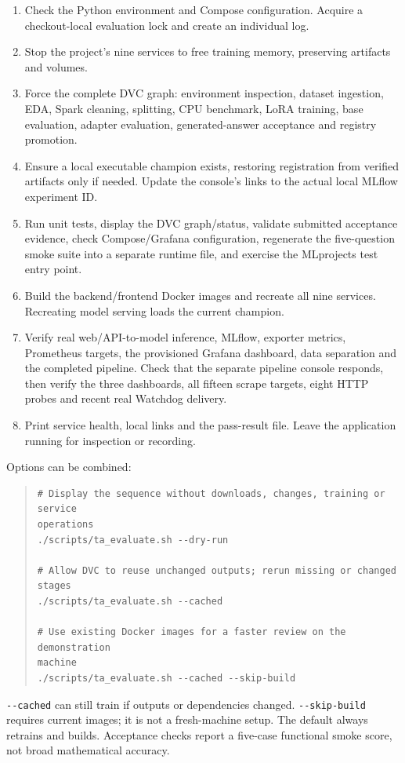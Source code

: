 \documentclass[11pt,a4paper]{article}
\begin{document}
\begin{enumerate}
\item Check the Python environment and Compose configuration. Acquire a checkout-local evaluation lock and create an individual log.
\item Stop the project's nine services to free training memory, preserving artifacts and volumes.
\item Force the complete DVC graph: environment inspection, dataset ingestion, EDA, Spark cleaning, splitting, CPU benchmark, LoRA training, base evaluation, adapter evaluation, generated-answer acceptance and registry promotion.
\item Ensure a local executable champion exists, restoring registration from verified artifacts only if needed. Update the console's links to the actual local MLflow experiment ID.
\item Run unit tests, display the DVC graph/status, validate submitted acceptance evidence, check Compose/Grafana configuration, regenerate the five-question smoke suite into a separate runtime file, and exercise the MLprojects test entry point.
\item Build the backend/frontend Docker images and recreate all nine services. Recreating model serving loads the current champion.
\item Verify real web/API-to-model inference, MLflow, exporter metrics, Prometheus targets, the provisioned Grafana dashboard, data separation and the completed pipeline. Check that the separate pipeline console responds, then verify the three dashboards, all fifteen scrape targets, eight HTTP probes and recent real Watchdog delivery.
\item Print service health, local links and the pass-result file. Leave the application running for inspection or recording.
\end{enumerate}
Options can be combined:

\begin{quote}\small
\begin{verbatim}
# Display the sequence without downloads, changes, training or service
operations
./scripts/ta_evaluate.sh --dry-run

# Allow DVC to reuse unchanged outputs; rerun missing or changed stages
./scripts/ta_evaluate.sh --cached

# Use existing Docker images for a faster review on the demonstration
machine
./scripts/ta_evaluate.sh --cached --skip-build
\end{verbatim}
\end{quote}
\texttt{-\allowbreak{}-\allowbreak{}cached} can still train if outputs or dependencies changed. \texttt{-\allowbreak{}-\allowbreak{}skip-\allowbreak{}build} requires current images; it is not a fresh-machine setup. The default always retrains and builds. Acceptance checks report a five-case functional smoke score, not broad mathematical accuracy.
\end{document}
